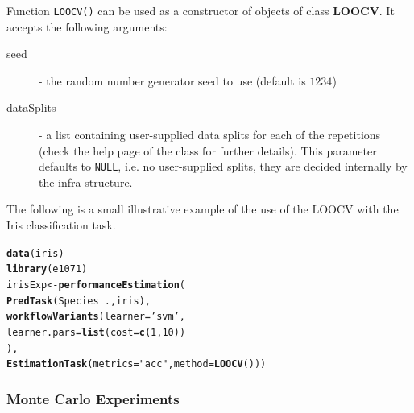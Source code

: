 \documentclass[10pt,a4paper]{article}\usepackage[]{graphicx}\usepackage[]{color}
\makeatletter
\newcommand{\hlnum}[1]{\textcolor[rgb]{0.686,0.059,0.569}{#1}}%
\newcommand{\hlstr}[1]{\textcolor[rgb]{0.192,0.494,0.8}{#1}}%
\newcommand{\hlopt}[1]{\textcolor[rgb]{0,0,0}{#1}}%
\newcommand{\hlstd}[1]{\textcolor[rgb]{0.345,0.345,0.345}{#1}}%
\newcommand{\hlkwb}[1]{\textcolor[rgb]{0.69,0.353,0.396}{#1}}%
\newcommand{\hlkwc}[1]{\textcolor[rgb]{0.333,0.667,0.333}{#1}}%
\newcommand{\hlkwd}[1]{\textcolor[rgb]{0.737,0.353,0.396}{\textbf{#1}}}%
\newenvironment{kframe}{%
 \def\at@end@of@kframe{}%
 \ifinner\ifhmode%
  \def\at@end@of@kframe{\end{minipage}}%
  \begin{minipage}{\columnwidth}%
 \fi\fi%
 \def\FrameCommand##1{\hskip\@totalleftmargin \hskip-\fboxsep
 \colorbox{shadecolor}{##1}\hskip-\fboxsep
     \hskip-\linewidth \hskip-\@totalleftmargin \hskip\columnwidth}%
 \MakeFramed {\advance\hsize-\width
   \@totalleftmargin\z@ \linewidth\hsize
   \@setminipage}}%
 {\par\unskip\endMakeFramed%
 \at@end@of@kframe}
\newenvironment{knitrout}{}{} %
\makeatother
\begin{document}
Function \texttt{LOOCV()} can be used as a constructor of
objects of class \textbf{LOOCV}. It accepts the following
arguments:

\begin{description}
\item[seed] - the random number generator seed to use (default is $1234$)
\item[dataSplits] - a list containing user-supplied data splits
  for each of the repetitions (check the help page of the
  class for further details). This parameter defaults to
  \texttt{NULL}, i.e. no user-supplied splits, they are decided
  internally by the infra-structure.
\end{description}


The following is a small illustrative example of the use of the
LOOCV with the Iris classification task.

\begin{knitrout}\footnotesize
{}\color{fgcolor}\begin{kframe}
\begin{alltt}
\hlkwd{data}\hlstd{(iris)}
\hlkwd{library}\hlstd{(e1071)}
\hlstd{irisExp} \hlkwb{<-} \hlkwd{performanceEstimation}\hlstd{(}
    \hlkwd{PredTask}\hlstd{(Species} \hlopt{~} \hlstd{.,iris),}
    \hlkwd{workflowVariants}\hlstd{(}\hlkwc{learner}\hlstd{=}\hlstr{'svm'}\hlstd{,}
                     \hlkwc{learner.pars}\hlstd{=}\hlkwd{list}\hlstd{(}\hlkwc{cost}\hlstd{=}\hlkwd{c}\hlstd{(}\hlnum{1}\hlstd{,}\hlnum{10}\hlstd{))}
                     \hlstd{),}
    \hlkwd{EstimationTask}\hlstd{(}\hlkwc{metrics}\hlstd{=}\hlstr{"acc"}\hlstd{,}\hlkwc{method}\hlstd{=}\hlkwd{LOOCV}\hlstd{()))}
\end{alltt}
\end{kframe}
\end{knitrout}


\subsubsection{Monte Carlo Experiments}\label{sec:MC}
\end{document}

